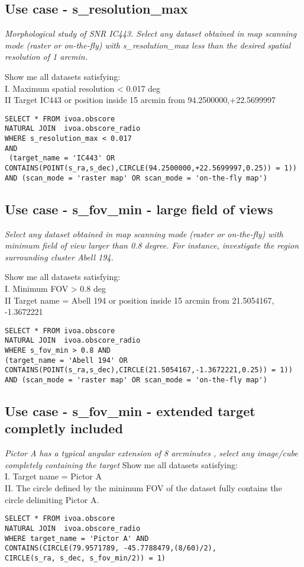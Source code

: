 \subsection{Use case - s\_resolution\_max}
\label{sec:s_resolution_max}
\textit{Morphological study of SNR IC443. Select any dataset obtained in map scanning mode (raster or on-the-fly) with s\_resolution\_max less than the desired spatial resolution of 1 arcmin.}

Show me all datasets satisfying: \\
I. Maximum spatial resolution < 0.017 deg \\
II Target IC443 or position inside 15 arcmin from 94.2500000,+22.5699997 \\

\begin{verbatim}
SELECT * FROM ivoa.obscore
NATURAL JOIN  ivoa.obscore_radio 
WHERE s_resolution_max < 0.017 
AND
 (target_name = 'IC443' OR
CONTAINS(POINT(s_ra,s_dec),CIRCLE(94.2500000,+22.5699997,0.25)) = 1)) 
AND (scan_mode = 'raster map' OR scan_mode = 'on-the-fly map')
\end{verbatim}

\subsection{Use case - s\_fov\_min - large field of views}
\label{sec:s_fov_min}
\textit{Select any dataset obtained in map scanning mode (raster or on-the-fly) with minimum field of view larger than 0.8 degree. For instance, investigate the region surrounding cluster Abell 194.}

Show me all datasets satisfying:\\
I. Minimum FOV > 0.8 deg \\
II Target name = Abell 194 or position inside 15 arcmin from 21.5054167, -1.3672221 \\
\begin{verbatim}
SELECT * FROM ivoa.obscore
NATURAL JOIN  ivoa.obscore_radio 
WHERE s_fov_min > 0.8 AND
(target_name = 'Abell 194' OR
CONTAINS(POINT(s_ra,s_dec),CIRCLE(21.5054167,-1.3672221,0.25)) = 1)) 
AND (scan_mode = 'raster map' OR scan_mode = 'on-the-fly map')
\end{verbatim}

\subsection{Use case - s\_fov\_min - extended target completly included}
\label{sec:s_fov_max}
\textit{Pictor A has a typical angular extension  of 8 arcminutes , select any image/cube completely containing the target}
Show me all datasets satisfying: \\
I. Target name = Pictor A \\
II. The circle defined by the minimum FOV of the dataset fully contains the circle delimiting Pictor A. \\
\begin{verbatim}
SELECT * FROM ivoa.obscore
NATURAL JOIN  ivoa.obscore_radio 
WHERE target_name = 'Pictor A' AND
CONTAINS(CIRCLE(79.9571789, -45.7788479,(8/60)/2),
CIRCLE(s_ra, s_dec, s_fov_min/2)) = 1)
\end{verbatim}

